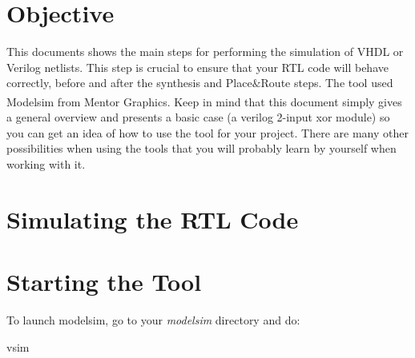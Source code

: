 \newcommand{\labtitle}{ECE/CS 5710/6710 - Modelsim Tutorial}
\newcommand{\labsubtitle}{Modelsim Tutorial}
\vlsiheader


\section{Objective}
This documents shows the main steps for performing the simulation of VHDL or Verilog netlists. This step is crucial to ensure that your RTL code will behave correctly, before and after the synthesis and Place$\&$Route steps. The tool used Modelsim\textsuperscript{\tiny\textregistered} from Mentor Graphics. Keep in mind that this document simply gives a general overview and presents a basic case (a verilog 2-input xor module) so you can get an idea of how to use the tool for your project. There are many other possibilities when using the tools that you will probably learn by yourself when working with it.

\section{Simulating the RTL Code}
\section{Starting the Tool}

 To launch modelsim, go to your \textit{modelsim} directory and do:
\begin{codeline}
	vsim
\end{codeline}


